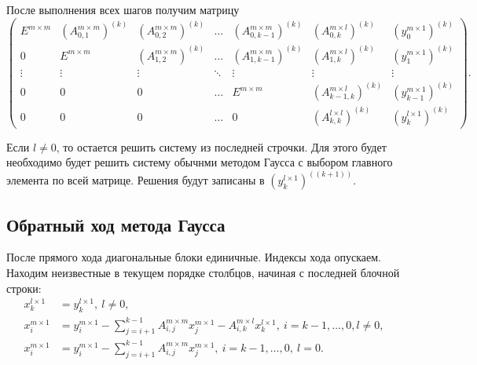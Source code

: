 \documentclass[a4paper,12pt]{article}
\newcommand{\br}[1]{\left(#1\right)}
\begin{document}
После выполнения всех шагов получим матрицу
\[
    \begin{pmatrix}
        E^{m \times m} & \br{A_{0, 1}^{m \times m}}^{(k)}     & \br{A_{0, 2}^{m \times m}}^{(k)}     & \dots  & \br{A_{0, k - 1}^{m \times m}}^{(k)}     & \br{A_{0, k}^{m \times l}}^{(k)}        & \br{y_{0}^{m \times 1}}^{(k)}     \\
        0              & E^{m \times m}                       & \br{A_{1, 2}^{m \times m}}^{(k)}     & \dots  & \br{A_{1, k - 1}^{m \times m}}^{(k)}     & \br{A_{1, k}^{m \times l}}^{(k)}        & \br{y_{1}^{m \times 1}}^{(k)}     \\
        \vdots         & \vdots                               & \vdots                               & \ddots & \vdots                                   & \vdots                                  & \vdots                            \\
        0              & 0                                    &  0                                   & \dots  & E^{m \times m}                           & \br{A_{k - 1, k}^{m \times l}}^{\br{k}} & \br{y_{k - 1}^{m \times 1}}^{(k)} \\
        0              & 0                                    &  0                                   & \dots  & 0                                        & \br{A_{k, k}^{l \times l}}^{(k)}        & \br{y_{k}^{l \times 1}}^{(k)}
    \end{pmatrix}.
\]

Если $l \neq 0$, то остается решить систему из последней строчки. Для этого будет необходимо будет решить систему обычнми методом Гаусса с выбором главного элемента по всей матрице. Решения будут записаны в $\br{y_{k}^{l \times 1}}^((k + 1))$.

\subsection{Обратный ход метода Гаусса}
После прямого хода диагональные блоки единичные. Индексы хода опускаем. Находим неизвестные в текущем порядке столбцов, начиная с последней блочной строки:
\begin{align*}
    x_{k}^{l \times 1} & = y_{k}^{l \times 1}, \ l \neq 0, \\
    x_{i}^{m \times 1} & = y_{i}^{m \times 1} - \sum_{j = i + 1}^{k - 1} A_{i, j}^{m \times m} x_{j}^{m \times 1} - A_{i, k}^{m \times l} x_{k}^{l \times 1}, \ i = k - 1, \dots, 0, l \neq 0, \\
    x_{i}^{m \times 1} & = y_{i}^{m \times 1} - \sum_{j = i + 1}^{k - 1} A_{i, j}^{m \times m} x_{j}^{m \times 1}, \ i = k - 1, \dots, 0, \ l = 0.
\end{align*}
\end{document}
